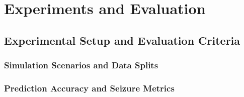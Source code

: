 \chapter{Experiments and Evaluation}
\label{ch:experiments}




\section{Experimental Setup and Evaluation Criteria}

\subsection{Simulation Scenarios and Data Splits}

\subsection{Prediction Accuracy and Seizure Metrics}


